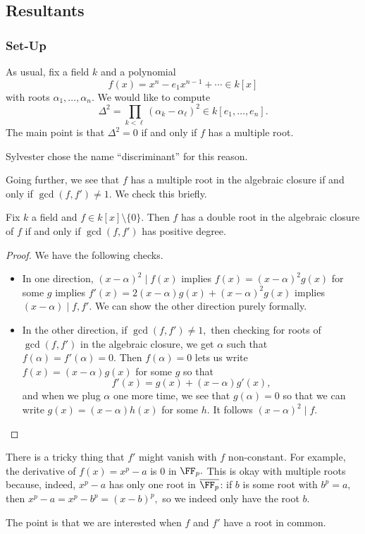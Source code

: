 \subsection{Resultants}
\subsubsection{Set-Up}
As usual, fix a field $k$ and a polynomial
\[f(x)=x^n-e_1x^{n-1}+\cdots\in k[x]\]
with roots $\alpha_1,\ldots,\alpha_n.$ We would like to compute
\[\Delta^2=\prod_{k<\ell}(\alpha_k-\alpha_\ell)^2\in k[e_1,\ldots,e_n].\]
The main point is that $\Delta^2=0$ if and only if $f$ has a multiple root.
\begin{remark}
	Sylvester chose the name ``discriminant'' for this reason.
\end{remark}
Going further, we see that $f$ has a multiple root in the algebraic closure if and only if $\gcd(f,f')\ne1.$ We check this briefly.
\begin{lemma}
	Fix $k$ a field and $f\in k[x]\setminus\{0\}.$ Then $f$ has a double root in the algebraic closure of $f$ if and only if $\gcd(f,f')$ has positive degree.
\end{lemma}
\begin{proof}
	We have the following checks.
	\begin{itemize}
		\item In one direction, $(x-\alpha)^2\mid f(x)$ implies $f(x)=(x-\alpha)^2g(x)$ for some $g$ implies $f'(x)=2(x-\alpha)g(x)+(x-\alpha)^2g(x)$ implies $(x-\alpha)\mid f,f'.$ We can show the other direction purely formally.
		\item In the other direction, if $\gcd(f,f')\ne1,$ then checking for roots of $\gcd(f,f')$ in the algebraic closure, we get $\alpha$ such that $f(\alpha)=f'(\alpha)=0.$ Then $f(\alpha)=0$ lets us write $f(x)=(x-\alpha)g(x)$ for some $g$ so that
		\[f'(x)=g(x)+(x-\alpha)g'(x),\]
		and when we plug $\alpha$ one more time, we see that $g(\alpha)=0$ so that we can write $g(x)=(x-\alpha)h(x)$ for some $h.$ It follows $(x-\alpha)^2\mid f.$
		\qedhere
	\end{itemize}
\end{proof}
\begin{remark}
	There is a tricky thing that $f'$ might vanish with $f$ non-constant. For example, the derivative of $f(x)=x^p-a$ is $0$ in $\FF_p.$ This is okay with multiple roots because, indeed, $x^p-a$ has only one root in $\overline{\FF_p}$: if $b$ is some root with $b^p=a,$ then $x^p-a=x^p-b^p=(x-b)^p,$ so we indeed only have the root $b.$
\end{remark}
The point is that we are interested when $f$ and $f'$ have a root in common.

